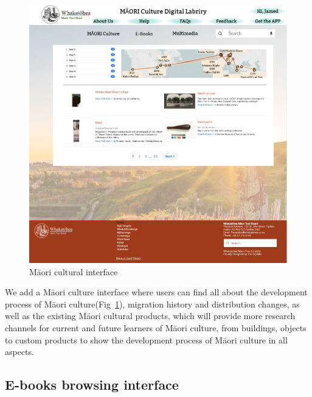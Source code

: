 \begin{figure}[htbp]
  \centerline{\includegraphics[width=400pt]{images/3-1-3.png}}
  \caption{Māori cultural interface}
  \label{fig32}
\end{figure}

We add a Māori culture interface where users can find all about the development process of Māori culture(Fig~\ref{fig32}), migration history and distribution changes, as well as the existing Māori cultural products, which will provide more research channels for current and future learners of Māori culture, from buildings, objects to custom products to show the development process of Māori culture in all aspects\autocite{MaoriCul4:online}.

\subsection{E-books browsing interface}

